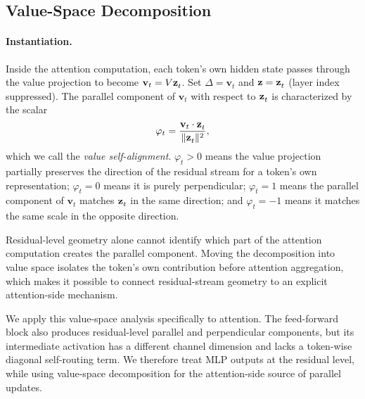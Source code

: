 \subsection{Value-Space Decomposition}
\label{sec:value-level}

\paragraph{Instantiation.}
Inside the attention computation, each token's own hidden state passes
through the value projection to become $\mathbf{v}_t = V\mathbf{z}^{}_{t}$.
Set $\Delta = \mathbf{v}_t$ and $\mathbf{z} = \mathbf{z}^{}_{t}$ (layer index
suppressed).  The parallel component of $\mathbf{v}_t$ with respect to
$\mathbf{z}^{}_{t}$ is characterized by the scalar
\begin{equation}
  \varphi_t
    = \frac{\mathbf{v}_t\cdot\mathbf{z}^{}_{t}}{\|\mathbf{z}^{}_{t}\|^2},
  \label{eq:phi}
\end{equation}
which we call the \emph{value self-alignment}.
$\varphi_t > 0$ means the value projection partially preserves the direction
of the residual stream for a token's own representation; $\varphi_t = 0$
means it is purely perpendicular; $\varphi_t = 1$ means the parallel component
of $\mathbf{v}_t$ matches $\mathbf{z}^{}_{t}$ in the same direction; and
$\varphi_t = -1$ means it matches the same scale in the opposite direction.

Residual-level geometry alone cannot identify which part of the attention
computation creates the parallel component. Moving the decomposition into
value space isolates the token's own contribution before attention
aggregation, which makes it possible to connect residual-stream geometry to
an explicit attention-side mechanism.

We apply this value-space analysis specifically to attention. The feed-forward
block also produces residual-level parallel and perpendicular components, but
its intermediate activation has a different channel dimension and lacks a
token-wise diagonal self-routing term. We therefore treat MLP outputs at the
residual level, while using value-space decomposition for the attention-side
source of parallel updates.

